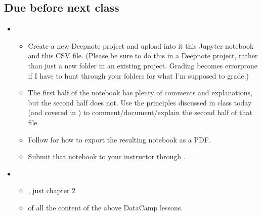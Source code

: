\documentclass[letterpaper,10pt,english]{jupyterBook}
\begin{document}
\subsection{Due before next class}
\label{\detokenize{course-schedule:id4}}\begin{itemize}
\item {} 
\sphinxAtStartPar
{}
\begin{itemize}
\item {} 
\sphinxAtStartPar
Create a new Deepnote project and upload into it this Jupyter notebook and this CSV file.  (Please be sure to do this in a  Deepnote project, rather than just a new folder in an existing project.  Grading becomes error\sphinxhyphen{}prone if I have to hunt through your folders for what I’m supposed to grade.)

\item {} 
\sphinxAtStartPar
The first half of the notebook has plenty of comments and explanations, but the second half does not.  Use the principles discussed in class today (and covered in {\hyperref[\detokenize{chapter-5-before-and-after::doc}]{}}) to comment/document/explain the second half of that file.

\item {} 
\sphinxAtStartPar
Follow  for how to export the resulting notebook as a PDF.

\item {} 
\sphinxAtStartPar
Submit that notebook to your instructor through .

\end{itemize}

\item {} 
\sphinxAtStartPar
{}
\begin{itemize}
\item {} 
\sphinxAtStartPar
{}, just chapter 2

\item {} 
\sphinxAtStartPar
{} of all the content of the above DataCamp lessons.

\end{itemize}


\end{itemize}
\end{document}
